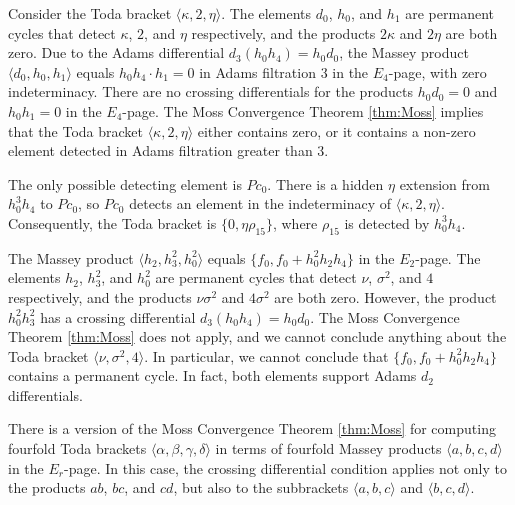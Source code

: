 \begin{ex}
Consider the Toda bracket $\langle \kappa, 2, \eta \rangle$.
The elements $d_0$, $h_0$, and $h_1$ are permanent cycles
that detect $\kappa$, $2$, and $\eta$ respectively, and
the products $2 \kappa$ and $2 \eta$ are both zero.
Due to the Adams differential $d_3(h_0h_4) = h_0d_0$, 
the Massey product $\langle d_0, h_0, h_1 \rangle$ equals
$h_0 h_4 \cdot h_1 = 0$ in Adams filtration 3 in the $E_4$-page,
with zero indeterminacy.
There are no crossing differentials for the products $h_0 d_0 = 0$ 
and $h_0 h_1 = 0$ in the $E_4$-page.
The Moss Convergence Theorem \ref{thm:Moss} implies that
the Toda bracket $\langle \kappa, 2, \eta \rangle$ either contains zero,
or it contains a non-zero element detected in Adams filtration
greater than $3$.

The only possible detecting element is $P c_0$. 
There is a hidden $\eta$ extension from $h_0^3h_4$ to $P c_0$, 
so $P c_0$ detects an element in the indeterminacy of 
$\langle \kappa, 2, \eta \rangle$.
Consequently, the Toda bracket is $\{0, \eta \rho_{15} \}$,
where $\rho_{15}$ is detected by $h_0^3h_4$.
\end{ex}

\begin{ex}
The Massey product $\langle h_2, h_3^2, h_0^2 \rangle$
equals $\{f_0, f_0 + h_0^2 h_2 h_4 \}$ in the $E_2$-page.
The elements $h_2$, $h_3^2$, and $h_0^2$ are permanent cycles
that detect $\nu$, $\sigma^2$, and $4$ respectively, and
the products $\nu \sigma^2$ and $4 \sigma^2$ are both zero.
However, the product $h_0^2 h_3^2$ has a crossing differential
$d_3(h_0 h_4) = h_0 d_0$.
The Moss Convergence Theorem \ref{thm:Moss} does not apply,
and we cannot conclude anything about the Toda bracket
$\langle \nu, \sigma^2, 4 \rangle$.  In particular,
we cannot conclude that $\{f_0, f_0 + h_0^2 h_2 h_4\}$ 
contains a permanent cycle.  In fact, both elements support
Adams $d_2$ differentials.
\end{ex}

\begin{remark}
\label{rem:Moss-4fold}
There is a version of the Moss Convergence Theorem \ref{thm:Moss}
for computing fourfold Toda brackets 
$\langle \alpha, \beta, \gamma, \delta\rangle$ in terms of fourfold
Massey products $\langle a, b, c, d \rangle$ in the $E_r$-page. 
In this case, the crossing differential condition applies not only to
the products $ab$, $bc$, and $cd$, but also to the subbrackets
$\langle a, b, c \rangle$ and $\langle b, c, d \rangle$.
\end{remark}

